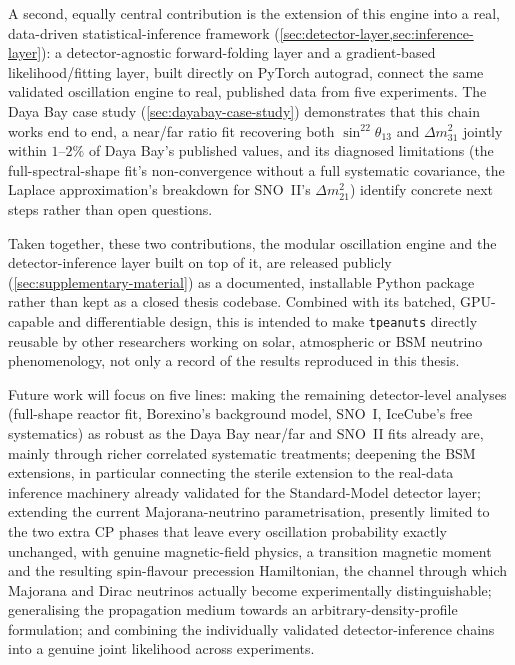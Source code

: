 A second, equally central contribution is the extension of this engine into a real, data-driven statistical-inference framework (\cref{sec:detector-layer,sec:inference-layer}): a detector-agnostic forward-folding layer and a gradient-based likelihood/fitting layer, built directly on PyTorch autograd, connect the same validated oscillation engine to real, published data from five experiments. The Daya Bay case study (\cref{sec:dayabay-case-study}) demonstrates that this chain works end to end, a near/far ratio fit recovering both \(\sin^22\theta_{13}\) and \(\Delta m^2_{31}\) jointly within \(1\)--\(2\%\) of Daya Bay's published values, and its diagnosed limitations (the full-spectral-shape fit's non-convergence without a full systematic covariance, the Laplace approximation's breakdown for SNO~II's \(\Delta m^2_{21}\)) identify concrete next steps rather than open questions.

Taken together, these two contributions, the modular oscillation engine and the detector-inference layer built on top of it, are released publicly (\cref{sec:supplementary-material}) as a documented, installable Python package rather than kept as a closed thesis codebase. Combined with its batched, GPU-capable and differentiable design, this is intended to make \texttt{tpeanuts} directly reusable by other researchers working on solar, atmospheric or BSM neutrino phenomenology, not only a record of the results reproduced in this thesis.

Future work will focus on five lines: making the remaining detector-level analyses (full-shape reactor fit, Borexino's background model, SNO~I, IceCube's free systematics) as robust as the Daya Bay near/far and SNO~II fits already are, mainly through richer correlated systematic treatments; deepening the BSM extensions, in particular connecting the sterile extension to the real-data inference machinery already validated for the Standard-Model detector layer; extending the current Majorana-neutrino parametrisation, presently limited to the two extra CP phases that leave every oscillation probability exactly unchanged, with genuine magnetic-field physics, a transition magnetic moment and the resulting spin-flavour precession Hamiltonian, the channel through which Majorana and Dirac neutrinos actually become experimentally distinguishable; generalising the propagation medium towards an arbitrary-density-profile formulation; and combining the individually validated detector-inference chains into a genuine joint likelihood across experiments.
